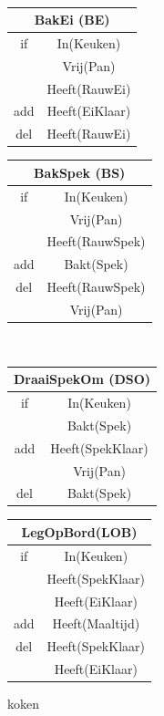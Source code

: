 \documentclass[alternative-exam.tex]{subfiles}
\begin{document}
\begin{itemize}
\begin{figure}[H]
\begin{tabular}{|c|c|}
    \hline
\end{tabular}
\\\vspace{0.25cm}
\begin{tabular}{|c|c|}
    \multicolumn{2}{c}{BakEi (BE)}\\
    \hline
    if & In(Keuken)\\
    & Vrij(Pan)\\
    & Heeft(RauwEi)\\
    \hline
    add & Heeft(EiKlaar)\\
    \hline
    del & Heeft(RauwEi)\\
    \hline
\end{tabular}
\hspace{0.25cm}
\begin{tabular}{|c|c|}
    \multicolumn{2}{c}{BakSpek (BS)}\\
    \hline
    if & In(Keuken)\\
    & Vrij(Pan)\\
    & Heeft(RauwSpek)\\
    \hline
    add & Bakt(Spek)\\
    \hline
    del & Heeft(RauwSpek)\\
    & Vrij(Pan)\\
    \hline
\end{tabular}
\\\vspace{0.25cm}
\begin{tabular}{|c|c|}
    \multicolumn{2}{c}{DraaiSpekOm (DSO)}\\
    \hline
    if & In(Keuken)\\
    & Bakt(Spek)\\
    \hline
    add & Heeft(SpekKlaar)\\
    & Vrij(Pan)\\
    \hline
    del & Bakt(Spek)\\
    \hline
\end{tabular}
\hspace{0.25cm}
\begin{tabular}{|c|c|}
    \multicolumn{2}{c}{LegOpBord(LOB)}\\
    \hline
    if & In(Keuken)\\
    & Heeft(SpekKlaar)\\
    & Heeft(EiKlaar)\\
    \hline
    add & Heeft(Maaltijd)\\
    \hline
    del & Heeft(SpekKlaar)\\
    & Heeft(EiKlaar)\\
    \hline
\end{tabular}
\caption{koken}
\label{koken}
\end{figure}
\end{itemize}
\end{document}
